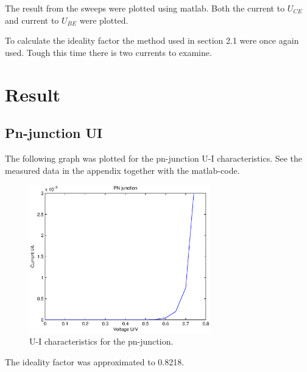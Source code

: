 \documentclass[a4paper]{article}
\begin{document}
The result from the sweeps were plotted using matlab. Both the current to $U_{CE}$ and current to $U_{BE}$ were plotted.

To calculate the ideality factor the method used in section 2.1 were once again used. Tough this time there is two currents to examine.

\section{Result}
\subsection{Pn-junction UI}
The following graph was plotted for the pn-junction U-I characteristics. See the measured data in the appendix together with the matlab-code.
\begin{figure}[H]
	\centering
	\includegraphics[width=0.7\textwidth]{pn_ui.eps}
	\caption{U-I characteristics for the pn-junction.}
	\label{pn_ui}
\end{figure}

The ideality factor was approximated to 0.8218.
\end{document}
